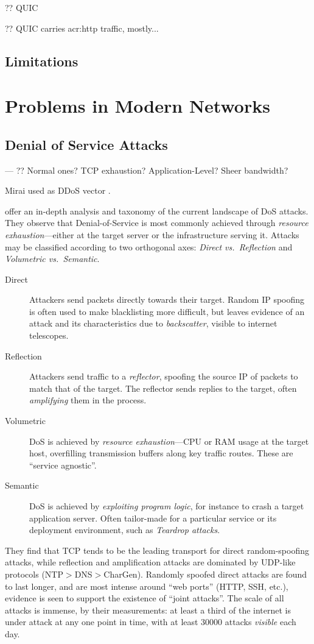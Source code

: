 ?? QUIC~\parencite{DBLP:conf/sigcomm/LangleyRWVKZYKS17}

?? QUIC carries \gls{acr:http} traffic, mostly...

\subsection{Limitations}

\section{Problems in Modern Networks}\label{sec:problems-in-modern-networks}

\subsection{Denial of Service Attacks}
---
?? Normal ones? TCP exhaustion? Application-Level? Sheer bandwidth?

Mirai used as DDoS vector \cite{DBLP:conf/uss/AntonakakisABBB17}.

\Textcite{DBLP:conf/imc/JonkerKKRSD17} offer an in-depth analysis and taxonomy of the current landscape of DoS attacks.
They observe that Denial-of-Service is most commonly achieved through \emph{resource exhaustion}---either at the target server or the infrastructure serving it.
Attacks may be classified according to two orthogonal axes: \emph{Direct vs.\ Reflection} and \emph{Volumetric vs.\ Semantic}.
\begin{description}
	\item[Direct] Attackers send packets directly towards their target. Random IP spoofing is often used to make blacklisting more difficult, but leaves evidence of an attack and its characteristics due to \emph{backscatter}, visible to internet telescopes.
	\item[Reflection] Attackers send traffic to a \emph{reflector}, spoofing the source IP of packets to match that of the target. The reflector sends replies to the target, often \emph{amplifying} them in the process.
	\item[Volumetric] DoS is achieved by \emph{resource exhaustion}---CPU or RAM usage at the target host, overfilling transmission buffers along key traffic routes. These are ``service agnostic''.
	\item[Semantic] DoS is achieved by \emph{exploiting program logic}, for instance to crash a target application server. Often tailor-made for a particular service or its deployment environment, such as \emph{Teardrop attacks}.
\end{description}
They find that TCP tends to be the leading transport for direct random-spoofing attacks, while reflection and amplification attacks are dominated by UDP-like protocols (NTP$>$DNS$>$CharGen).
Randomly spoofed direct attacks are found to last longer, and are most intense around ``web ports'' (HTTP, SSH, etc.), evidence is seen to support the existence of ``joint attacks''.
The scale of all attacks is immense, by their measurements: at least a third of the internet is under attack at any one point in time, with at least \num{30000} attacks \emph{visible} each day.

